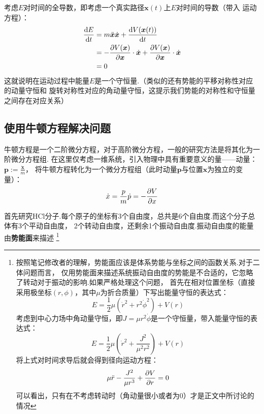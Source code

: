     考虑$E$对时间的全导数，即考虑一个真实路径$\bm{x}(t)$上$E$对时间的导数（带入
    运动方程）：
    \begin{equation}
        \begin{split}
            \frac{\mathrm{d}{E}}{\mathrm{d}{t}} & = m\ddot{\bm{x}}\dot{\bm{x}} + \frac{\mathrm{d}{V(\bm{x}(t))}}{\mathrm{d}{t}}\\
            & = - \frac{\partial{V(\bm{x})}}{\partial{\bm{x}}} \cdot \dot{\bm{x}} + \frac{\partial{V(\bm{x})}}{\partial{\bm{x}}}
            \cdot \dot{\bm{x}}\\
            & = 0
        \end{split}
    \end{equation}
    这就说明在运动过程中能量$E$是一个守恒量.（类似的还有势能的平移对称性对应的动量守恒和
    旋转对称性对应的角动量守恒，这提示我们势能的对称性和守恒量之间存在对应关系）
    \subsection{使用牛顿方程解决问题}
    牛顿方程是一个二阶微分方程，对于高阶微分方程，一般的研究方法是将其化为一阶微分方程组.
    在这里仅考虑一维系统，引入物理中具有重要意义的量——动量：$\bm{p} := \frac{\dot{\bm{x}}}{m}$，
    将牛顿方程转化为一个微分方程组（此时动量$\bm{p}$与位置$\bm{x}$为独立的变量）：
    \begin{equation}
        \dot{x} = \frac pm\\
        \dot{p} = -\frac {\partial V}{\partial x}
    \end{equation}
    \par
    首先研究HCl分子.每个原子的坐标有3个自由度，总共是6个自由度.而这个分子总体有3个平动自由度，
    2个转动自由度，还剩余1个振动自由度.振动自由度的能量由\textbf{势能面}来描述
    \footnote{按照笔记修改者的理解，势能面应该是体系势能与坐标之间的函数关系.对于二体问题而言，
    仅用势能面来描述系统振动自由度的势能是不合适的，它忽略了转动对于振动的影响.如果严格处理这个问题，
    首先在相对位置坐标（直接采用极坐标$(r, \phi)$，其中$\mu$为折合质量）下写出能量守恒的表达式：
    \begin{equation}
        E = \frac{1}{2}\mu\left(\dot{r}^2 + r^2\dot{\phi}^2\right) + V(r)
    \end{equation}
    考虑到中心力场中角动量守恒，即$J = \mu r^2 \dot{\phi}$是一个守恒量，带入能量守恒的表达式：
    \begin{equation}
        E = \frac{1}{2}\mu\left(\dot{r}^2 + \frac{J^2}{\mu^2r^2}\right) + V(r)
    \end{equation}
    将上式对时间求导后就会得到径向运动方程：
    \begin{equation}
        \mu \ddot{r} - \frac{J^2}{\mu r^3} + \frac{\partial{V}}{\partial{r}} = 0
    \end{equation}
    可以看出，只有在不考虑转动时（角动量很小或者为0）才是正文中所讨论的情况
    }
